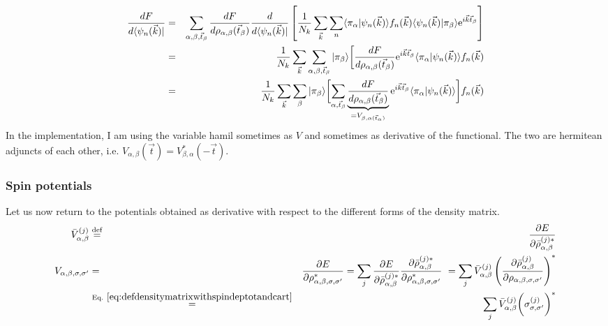 \documentclass[11pt,a4paper]{report}
\begin{document}
\begin{itemize}
\begin{eqnarray*}
\frac{dF}{d\langle\psi_n(\vec{k})|}
&=&
\sum_{\alpha,\beta,\vec{t}_\beta}
 \frac{dF}{d\rho_{\alpha,\beta}(\vec{t}_\beta)}
\frac{d}{d\langle\psi_n(\vec{k})|}
\left[\frac{1}{N_k}\sum_{\vec{k}}
\sum_n\langle\pi_\alpha|\psi_n(\vec{k})\rangle f_n(\vec{k})
\langle\psi_n(\vec{k})|\pi_\beta\rangle\mathrm{e}^{i\vec{k}\vec{t}_\beta}\right]
\\
&=&
\frac{1}{N_k}\sum_{\vec{k}}\sum_{\alpha,\beta,\vec{t}_\beta} 
|\pi_\beta\rangle
\biggl[
\frac{dF}{d\rho_{\alpha,\beta}(\vec{t}_\beta)}\mathrm{e}^{i\vec{k}\vec{t}_\beta}
\langle\pi_\alpha|\psi_n(\vec{k})\rangle f_n(\vec{k})
\\
&=&
\frac{1}{N_k}\sum_{\vec{k}}\sum_{\beta}
|\pi_\beta\rangle
\biggl[\sum_{\alpha,\vec{t}_\beta} 
\underbrace{\frac{dF}{d\rho_{\alpha,\beta}(\vec{t}_\beta)}}
_{=V_{\beta,\alpha(\vec{t}_\alpha)}}
\mathrm{e}^{i\vec{k}\vec{t}_\beta}
\langle\pi_\alpha|\psi_n(\vec{k})\rangle\biggr] f_n(\vec{k})
\end{eqnarray*}
In the implementation, I am using the variable hamil sometimes as $V$
and sometimes as derivative of the functional. The two are hermitean
adjuncts of each other,
i.e. $V_{\alpha,\beta}(\vec{t})=V_{\beta,\alpha}^*(-\vec{t})$.

\end{itemize}

\subsubsection{Spin potentials}
Let us now return to the potentials obtained as derivative with
respect to the different forms of the density matrix.
\begin{eqnarray*}
\bar{V}^{(j)}_{\alpha,\beta}&\defas&
\frac{\partial E}{\partial \bar{\rho}^{(j)*}_{\alpha,\beta}}
\\
V_{\alpha,\beta,\sigma,\sigma'}&=&\frac{\partial E}{\partial\rho_{\alpha,\beta,\sigma,\sigma'}^*}
=\sum_j\frac{\partial E}{\partial \bar{\rho}^{(j)*}_{\alpha,\beta}}
\frac{\partial\bar{\rho}^{(j)*}_{\alpha,\beta}}{\partial\rho_{\alpha,\beta,\sigma,\sigma'}^*}\
=\sum_j\bar{V}_{\alpha,\beta}^{(j)}
\left(\frac{\partial\bar{\rho}^{(j)}_{\alpha,\beta}}{\partial\rho_{\alpha,\beta,\sigma,\sigma'}}\right)^*
\\
&\eqrel{eq:defdensitymatrixwithspindeptotandcart}{=}&
\sum_j\bar{V}_{\alpha,\beta}^{(j)}\biggl(\sigma^{(j)}_{\sigma,\sigma'}\biggr)^*
\end{eqnarray*}
\end{document}
